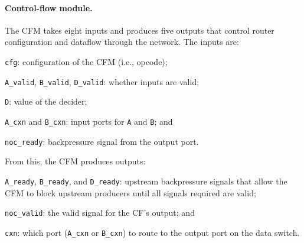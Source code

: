 \paragraph{Control-flow module.}
%
The CFM takes eight inputs and produces five outputs that control router
configuration and dataflow through the network.
% 
The inputs are:
\begin{compactitem}

\item {\tt cfg}: configuration of the CFM (i.e., opcode);

\item {\tt A\_valid}, {\tt B\_valid}, {\tt D\_valid}: whether inputs are valid;

\item {\tt D}: value of the decider;

\item {\tt A\_cxn} and {\tt B\_cxn}: input ports for {\tt A} and {\tt B}; and

\item {\tt noc\_ready}: backpressure signal from the output port.
  
\end{compactitem}
%
From this, the CFM produces outputs:
\begin{compactitem}
  
\item {\tt A\_ready}, {\tt B\_ready}, and {\tt D\_ready}: upstream
  backpressure signals that allow the CFM to block upstream
  producers until all signals required are valid;

\item {\tt noc\_valid}: the valid signal for the CF's output; and

\item {\tt cxn}: which port ({\tt A\_cxn} or {\tt B\_cxn}) to route
  to the output port on the data switch.
  
\end{compactitem}

